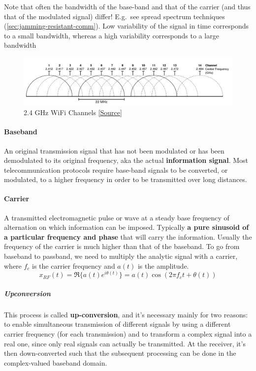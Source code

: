 Note that often the bandwidth of the base-band and that of the carrier (and
thus that of the modulated signal) differ! E.g.\ see spread spectrum techniques
(\autoref{sec:jamming-resistant-comm}). Low variability of the signal in time
corresponds to a small bandwidth, whereas a high variability corresponds to a
large bandwidth

\begin{figure}[h]
	\centering
	\includegraphics[scale=0.35]{images/1-wifi-channels.png}
	\caption{2.4 GHz WiFi Channels \href{https://en.wikipedia.org/wiki/List\_of\_WLAN\_channels\#/media/File:2.4\_GHz\_Wi-Fi\_channels\_(802.11b,g_WLAN).svg}{[Source]}}%
	\label{fig:wifi-channels}
\end{figure}

\paragraph{Baseband}
An original transmission signal that has not been modulated or has been
demodulated to its original frequency, aka the actual \textbf{information
	signal}. Most telecommunication protocols require base-band signals to be
converted, or modulated, to a higher frequency in order to be transmitted over
long distances.

\paragraph{Carrier}
A transmitted electromagnetic pulse or wave at a steady base frequency of
alternation on which information can be imposed. Typically \textbf{a pure
	sinusoid of a particular frequency and phase} that will carry the information.
Usually the frequency of the carrier is much higher than that of the baseband.
To go from baseband to passband, we need to multiply the analytic signal with a
carrier, where $f_c$ is the carrier frequency and $a(t)$ is the amplitude.
\[ x_{RF} (t) = \Re \{a(t)e^{i\theta (t)}\} = a(t) \cos (2 \pi f_c t + \theta(t))\]

\subparagraph{Upconversion}
This process is called \textbf{up-conversion}, and it's necessary mainly for
two reasons: to enable simultaneous transmission of different signals by using
a different carrier frequency (for each transmission) and to transform a
complex signal into a real one, since only real signals can actually be
transmitted. At the receiver, it's then down-converted such that the subsequent
processing can be done in the complex-valued baseband domain.

